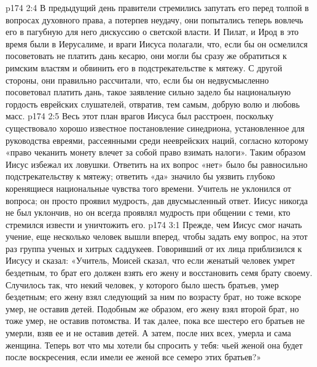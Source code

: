 \vs p174 2:4 В предыдущий день правители стремились запутать его перед толпой в вопросах духовного права, а потерпев неудачу, они попытались теперь вовлечь его в пагубную для него дискуссию о светской власти. И Пилат, и Ирод в это время были в Иерусалиме, и враги Иисуса полагали, что, если бы он осмелился посоветовать не платить дань кесарю, они могли бы сразу же обратиться к римским властям и обвинить его в подстрекательстве к мятежу. С другой стороны, они правильно рассчитали, что, если бы он недвусмысленно посоветовал платить дань, такое заявление сильно задело бы национальную гордость еврейских слушателей, отвратив, тем самым, добрую волю и любовь масс.
\vs p174 2:5 Весь этот план врагов Иисуса был расстроен, поскольку существовало хорошо известное постановление синедриона, установленное для руководства евреями, рассеянными среди нееврейских наций, согласно которому «право чеканить монету влечет за собой право взимать налоги». Таким образом Иисус избежал их ловушки. Ответить на их вопрос «нет» было бы равносильно подстрекательству к мятежу; ответить «да» значило бы уязвить глубоко коренящиеся национальные чувства того времени. Учитель не уклонился от вопроса; он просто проявил мудрость, дав двусмысленный ответ. Иисус никогда не был уклончив, но он всегда проявлял мудрость при общении с теми, кто стремился извести и уничтожить его.
\vs p174 3:1 Прежде, чем Иисус смог начать учение, еще несколько человек вышли вперед, чтобы задать ему вопрос, на этот раз группа ученых и хитрых саддукеев. Говоривший от их лица приблизился к Иисусу и сказал: «Учитель, Моисей сказал, что если женатый человек умрет бездетным, то брат его должен взять его жену и восстановить семя брату своему. Случилось так, что некий человек, у которого было шесть братьев, умер бездетным; его жену взял следующий за ним по возрасту брат, но тоже вскоре умер, не оставив детей. Подобным же образом, его жену взял второй брат, но тоже умер, не оставив потомства. И так далее, пока все шестеро его братьев не умерли, взяв ее и не оставив детей. А затем, после них всех, умерла и сама женщина. Теперь вот что мы хотели бы спросить у тебя: чьей женой она будет после воскресения, если имели ее женой все семеро этих братьев?»
